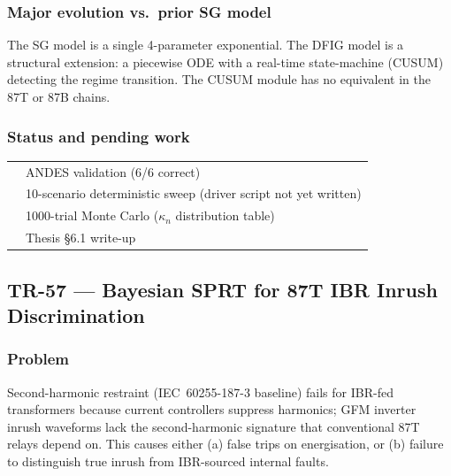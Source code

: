 \documentclass[12pt,a4paper]{article}
\newcommand{\cmark}{\ding{51}}
\newcommand{\pmark}{\ding{118}}   %
\newcommand{\kn}{\kappa_n}
\begin{document}
\subsubsection{Major evolution vs.\ prior SG model}
The SG model is a single 4-parameter exponential.  The DFIG model is a
structural extension: a piecewise ODE with a real-time state-machine (CUSUM)
detecting the regime transition.  The CUSUM module has no equivalent in the
87T or 87B chains.

\subsubsection{Status and pending work}
\begin{tabular}{ll}
  \cmark & ANDES validation (6/6 correct) \\
  \pmark & 10-scenario deterministic sweep (driver script not yet written) \\
  \pmark & 1000-trial Monte Carlo ($\kn$ distribution table) \\
  \pmark & Thesis §6.1 write-up \\
\end{tabular}

\bigskip

\subsection{TR-57 — Bayesian SPRT for 87T IBR Inrush Discrimination}
\label{sec:tr57}

\subsubsection{Problem}
Second-harmonic restraint (IEC~60255-187-3 baseline) fails for
IBR-fed transformers because current controllers suppress harmonics;
GFM inverter inrush waveforms lack the second-harmonic signature that
conventional 87T relays depend on.  This causes either (a) false trips
on energisation, or (b) failure to distinguish true inrush from
IBR-sourced internal faults.
\end{document}
